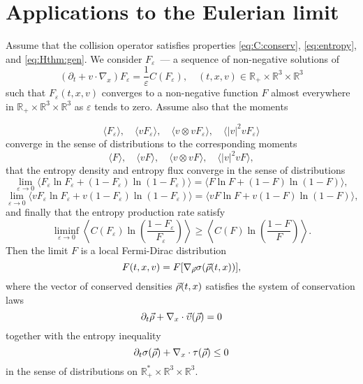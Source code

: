 \section{Applications to the Eulerian limit} %
\label{sec:application}

\begin{theorem}\label{th:CEE}
Assume that the collision operator satisfies properties \eqref{eq:C:conserv},
 \eqref{eq:entropy}, and \eqref{eq:Hthm:gen}. We consider
$F_\varepsilon$~--- a sequence of non-negative solutions of 
 \begin{equation}
(\partial_t+v\cdot\nabla_x)F_\varepsilon =
\frac{1}{\varepsilon}C(F_\varepsilon),\quad (t,x,v)\in \mathbb R_+\times \mathbb R^3\times \mathbb R^3
\label{eq:compEuler}
\end{equation} 
such that $F_\varepsilon(t,x,v)$ converges to a non-negative function $F$ almost
everywhere in $\mathbb R_+\times \mathbb R^3\times \mathbb R^3$ as $\varepsilon$ tends  to zero. Assume also that the  moments


\[\langle F_\varepsilon\rangle,\quad \langle vF_\varepsilon\rangle,
\quad \langle v\otimes v F_\varepsilon\rangle,\quad \langle
|v|^2vF_\varepsilon\rangle\]
 converge in the sense of distributions to the corresponding moments
\[\langle F \rangle,\quad \langle vF \rangle,
\quad \langle v\otimes v F \rangle,\quad \langle |v|^2vF \rangle,\]
that the entropy density and entropy  flux converge in the sense of distributions
\[\lim\limits_{\varepsilon\to 0}\langle  F_\varepsilon\ln F_\varepsilon +
(1-F_\varepsilon)\ln (1-F_\varepsilon) \rangle
=\langle F \ln F  + (1-F )\ln (1-F) \rangle,\]
\[\lim\limits_{\varepsilon\to 0}\langle v F_\varepsilon\ln F_\varepsilon +
v(1-F_\varepsilon)\ln (1- F_\varepsilon) \rangle
=\langle vF \ln F  + v(1-F )\ln (1-F) \rangle,\]
and finally that the entropy production rate satisfy
\[\liminf_{\varepsilon\to 0} \left\langle
C(F_\varepsilon)\ln\left(\frac{1-F_\varepsilon}{F_\varepsilon}
\right)\right\rangle\ge \left\langle C(F )\ln\left(\frac
{1-F }{F }\right)\right\rangle.\]
Then the limit $F$ is a local Fermi-Dirac distribution
\[F(t,x,v) = F[\nabla_{{\vec\rho}}\sigma({\vec\rho}(t,x))], \]
where the vector of conserved densities ${\vec\rho}(t,x)$ satisfies the system of conservation laws 
\begin{equation}\label{eq:compEulerDiv}\partial_t \vec \rho +
\nabla_x\cdot\vec\upsilon({\vec\rho})=0\end{equation}
together with the entropy inequality
\begin{equation}\label{eq:compEulerEntr}
	 \partial_t \sigma(\vec \rho)+\nabla_x\cdot\tau({\vec\rho})\le 0 
\end{equation}
in the sense of distributions on $\mathbb R^\ast_+\times \mathbb R^3\times \mathbb R^3$.
\end{theorem}

